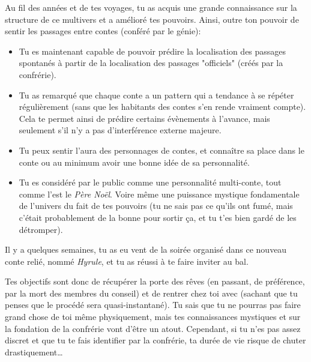{	
	\par Au fil des années et de tes voyages, tu as acquis une grande connaissance sur la structure de ce multivers et a amélioré tes pouvoirs. Ainsi, outre ton pouvoir de sentir les passages entre contes (conféré par le génie):
	\begin{itemize}
		\item Tu es maintenant capable de pouvoir prédire la localisation des passages spontanés à partir de la localisation des passages "officiels" (créés par la confrérie).
		\item Tu as remarqué que chaque conte a un pattern qui a tendance à se répéter régulièrement (sans que les habitants des contes s'en rende vraiment compte). Cela te permet ainsi de prédire certains évènements à l'avance, mais seulement s'il n'y a pas d'interférence externe majeure.
		\item Tu peux sentir l'aura des personnages de contes, et connaître sa place dans le conte ou au minimum avoir une bonne idée de sa personnalité.
		\item Tu es considéré par le public comme une personnalité multi-conte, tout comme l'est le \emph{Père Noël}. Voire même une puissance mystique fondamentale de l'univers du fait de tes pouvoirs (tu ne sais pas ce qu'ils ont fumé, mais c'était probablement de la bonne pour sortir ça, et tu t'es bien gardé de les détromper).
	\end{itemize}
	
	\par Il y a quelques semaines, tu as eu vent de la soirée organisé dans ce nouveau conte relié, nommé \emph{Hyrule}, et tu as réussi à te faire inviter au bal.
	
	\par Tes objectifs sont donc de récupérer la porte des rêves (en passant, de préférence, par la mort des membres du conseil) et de rentrer chez toi avec (sachant que tu penses que le procédé sera quasi-instantané). Tu sais que tu ne pourras pas faire grand chose de toi même physiquement, mais tes connaissances mystiques et sur la fondation de la confrérie vont d'être un atout. Cependant, si tu n'es pas assez discret et que tu te fais identifier par la confrérie, ta durée de vie risque de chuter drastiquement\dots
	
}
